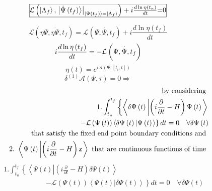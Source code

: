 \documentclass[aps,preprint]{revtex4}
\begin{document}
\begin{equation}
\frame{$\mathcal{L}\left( \left\vert \Lambda _{f}\right\rangle ,\left.
\left\vert \dot{\Psi}\left( t_{f}\right) \right\rangle \right\vert
_{\left\vert \Psi \left( t_{f}\right) \right\rangle =\left\vert \Lambda
_{f}\right\rangle }\right) +i\frac{d\ln \eta \left( t_{\kappa }\right) }{dt}$%
=0}
\end{equation}%
\begin{equation}
\mathcal{L}\left( \eta \Psi ,\overset{\cdot }{\eta \Psi },t_{f}\right) =%
\mathcal{L}\left( \Psi ,\overset{\cdot }{\Psi },t_{f}\right) +i\frac{d\ln
\eta \left( t_{f}\right) }{dt}
\end{equation}%
\begin{equation}
i\frac{d\ln \eta \left( t_{f}\right) }{dt}=-\mathcal{L}\left( \Psi ,\overset{%
\cdot }{\Psi },t_{f}\right)
\end{equation}%
\begin{equation}
\eta \left( t\right) =e^{i\mathcal{A}\left( \Psi ,\left[ t_{i},t\right]
\right) }
\end{equation}%
\begin{equation}
\delta ^{\left( 1\right) }\mathcal{A}\left( \Psi ,\tau \right)
=0\Longrightarrow
\end{equation}%
\begin{eqnarray}
&&\text{ \ \ \ \ \ \ \ by considering } \\
&&1.\int_{t_{u}}^{t_{f}}\left\{ \left\langle \delta \Psi \left( t\right)
\left\vert \left( i\frac{\partial }{\partial t}-H\right) \Psi \left(
t\right) \right. \right\rangle \right. \\
&&\qquad \left. {}\right. \ \ \ \ \ \ \ \ \ \ \ \ \ \ \ \ \ \ \left. -%
\mathcal{L}\left( \Psi \left( t\right) \right) \left\langle \delta \Psi
\left( t\right) \left\vert \Psi \left( t\right) \right. \right\rangle
\right\} dt=0\quad \forall \delta \Psi \left( t\right) \\
\qquad &&\text{that satisfy the fixed end point boundary conditions and } \\
&&2.\text{ }\left\langle \Psi \left( t\right) \left\vert \left( i\frac{%
\partial }{\partial t}-H\right) \mathsf{z}\right. \right\rangle \text{ that
are continuous functions of time }
\end{eqnarray}%
\begin{eqnarray}
&&1.\int_{t_{u}}^{t_{f}}\left\{ \left\langle \Psi \left( t\right) \left\vert
\left( i\frac{\partial }{\partial t}-H\right) \delta \Psi \left( t\right)
\right. \right\rangle \right. \\
&&\qquad \left. {}\right. \ \ \ \ \ \ \ \ \ \ \ \ \ \ \ \ \ \ \left. -%
\mathcal{L}\left( \Psi \left( t\right) \right) \left\langle \Psi \left(
t\right) \left\vert \delta \Psi \left( t\right) \right. \right\rangle
\right\} dt=0\quad \forall \delta \Psi \left( t\right)
\end{eqnarray}%
\end{document}
